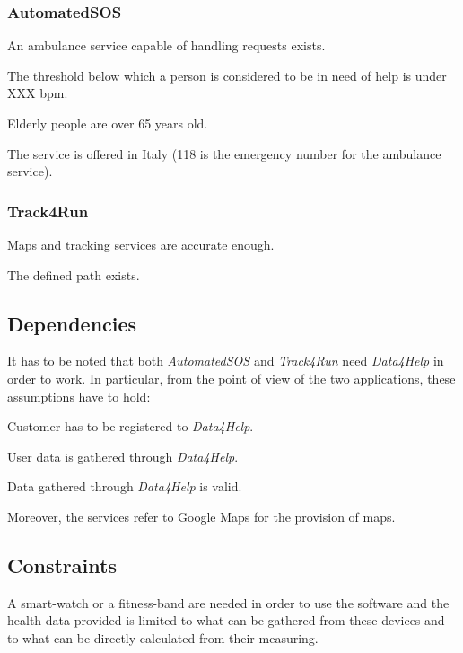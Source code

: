         \subsubsection{AutomatedSOS}
            \begin{enumerate}[label={[}D2.\arabic*{]}]
                \item An ambulance service capable of handling requests exists.
                
                \item The threshold below which a person is considered to be in need of help is under XXX bpm. %
                \item Elderly people are over 65 years old.
                
                \item The service is offered in Italy (118 is the emergency number for the ambulance service).
            \end{enumerate}
            
            \subsubsection{Track4Run}
                \begin{enumerate}[label={[}D3.\arabic*{]}]
                    \item Maps and tracking services are accurate enough.
                    
                    \item The defined path exists.
                \end{enumerate}
                
    \subsection{Dependencies}
        It has to be noted that both \emph{AutomatedSOS} and \emph{Track4Run} need \emph{Data4Help} in order to work. In particular, from the point of view of the two applications, these assumptions have to hold:
        \begin{enumerate}[label={[}D2-3.\arabic*{]}]
            \item Customer has to be registered to \emph{Data4Help}.
            
            \item User data is gathered through \emph{Data4Help}.
            
            \item Data gathered through \emph{Data4Help} is valid.
        \end{enumerate}
        
        Moreover, the services refer to Google Maps for the provision of maps.
        
    \subsection{Constraints}
        A smart-watch or a fitness-band are needed in order to use the software and the health data provided is limited to what can be gathered from these devices and to what can be directly calculated from their measuring.
